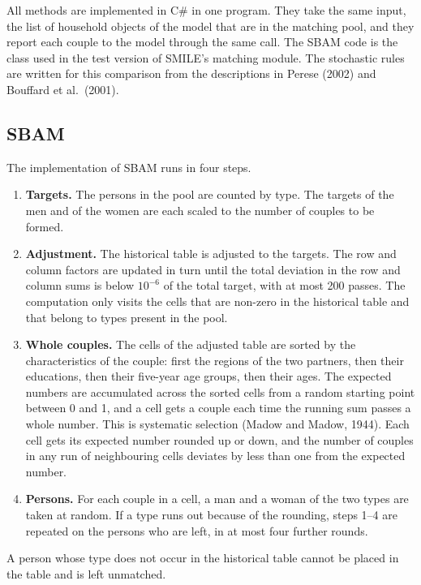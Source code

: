 \documentclass[12pt,a4paper]{article}
\begin{document}
All methods are implemented in C\# in one program. They take the same input, the list of
household objects of the model that are in the matching pool, and they report each couple to the
model through the same call. The SBAM code is the class used in the test version of SMILE's
matching module. The stochastic rules are written for this comparison from the descriptions in
Perese (2002) and Bouffard et al.\ (2001).

\subsection{SBAM}

The implementation of SBAM runs in four steps.

\begin{enumerate}
\item \textbf{Targets.} The persons in the pool are counted by type. The targets of the men and
of the women are each scaled to the number of couples to be formed.

\item \textbf{Adjustment.} The historical table is adjusted to the targets. The row and column
factors are updated in turn until the total deviation in the row and column sums is below
$10^{-6}$ of the total target, with at most 200 passes. The computation only visits the cells
that are non-zero in the historical table and that belong to types present in the pool.

\item \textbf{Whole couples.} The cells of the adjusted table are sorted by the characteristics
of the couple: first the regions of the two partners, then their educations, then their five-year
age groups, then their ages. The expected numbers are accumulated across the sorted cells from a
random starting point between 0 and 1, and a cell gets a couple each time the running sum passes
a whole number. This is systematic selection (Madow and Madow, 1944). Each cell gets its expected
number rounded up or down, and the number of couples in any run of neighbouring cells deviates by
less than one from the expected number.

\item \textbf{Persons.} For each couple in a cell, a man and a woman of the two types are taken
at random. If a type runs out because of the rounding, steps 1--4 are repeated on the persons who
are left, in at most four further rounds.
\end{enumerate}

A person whose type does not occur in the historical table cannot be placed in the table and is
left unmatched.
\end{document}
